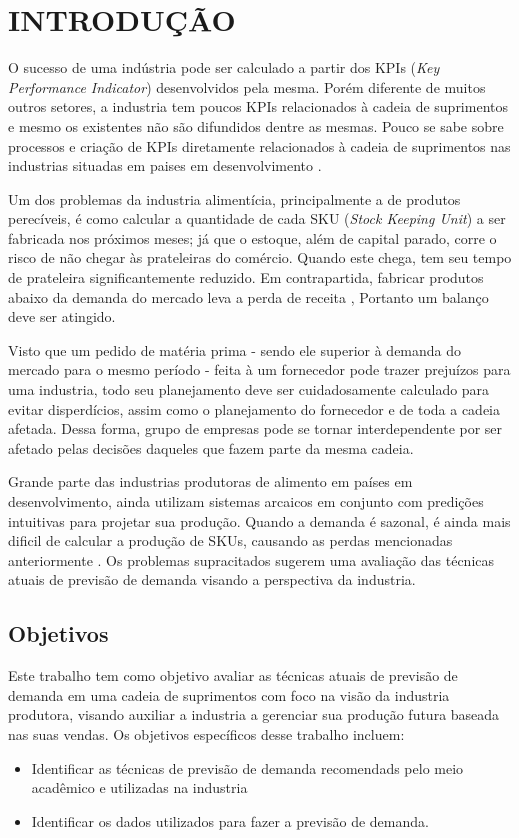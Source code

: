 
\chapter{INTRODUÇÃO}


O sucesso de uma indústria pode ser calculado a partir dos KPIs (\textit{Key Performance Indicator}) desenvolvidos pela mesma. Porém diferente de muitos outros setores, a industria tem poucos KPIs relacionados à cadeia de suprimentos e mesmo os existentes não são difundidos dentre as mesmas. Pouco se sabe sobre processos e criação de KPIs diretamente relacionados à cadeia de suprimentos nas industrias situadas em paises em desenvolvimento \cite{chae2009developing}.

Um dos problemas da industria alimentícia, principalmente a de produtos perecíveis, é como calcular a quantidade de cada SKU (\textit{Stock Keeping Unit}) a ser fabricada nos próximos meses; já que o estoque,  além de capital parado, corre o risco de não chegar às prateleiras do comércio. Quando este chega, tem seu tempo de prateleira significantemente reduzido. Em contrapartida, fabricar produtos abaixo da demanda do mercado leva a perda de receita \cite{aburto2007improved}, Portanto um balanço deve ser atingido.

Visto que um pedido de matéria prima - sendo ele superior à demanda do mercado para o mesmo período -  feita à um fornecedor pode trazer prejuízos para uma industria, todo seu planejamento deve ser cuidadosamente calculado para evitar disperdícios, assim como o planejamento do fornecedor e de toda a cadeia afetada. Dessa forma, grupo de empresas pode se tornar interdependente por ser afetado pelas decisões daqueles que fazem parte da mesma cadeia.

Grande parte das industrias produtoras de alimento em países em desenvolvimento, ainda utilizam sistemas arcaicos em conjunto com predições intuitivas para projetar sua produção. Quando a demanda é sazonal, é ainda mais dificil de calcular a produção de SKUs, causando as perdas mencionadas anteriormente \cite{yenradee2001demand}. Os problemas supracitados sugerem uma avaliação das técnicas atuais de previsão de demanda visando a perspectiva da industria.

\section{Objetivos}
Este trabalho tem como objetivo avaliar as técnicas atuais de previsão de demanda em uma cadeia de suprimentos com foco na visão da industria produtora, visando auxiliar a industria a gerenciar sua produção futura baseada nas suas vendas.
Os objetivos específicos desse trabalho incluem:
\begin{itemize}
\item{Identificar as técnicas de previsão de demanda recomendads pelo meio acadêmico e utilizadas na industria}
\item{Identificar os dados utilizados para fazer a previsão de demanda.}
\end{itemize}

